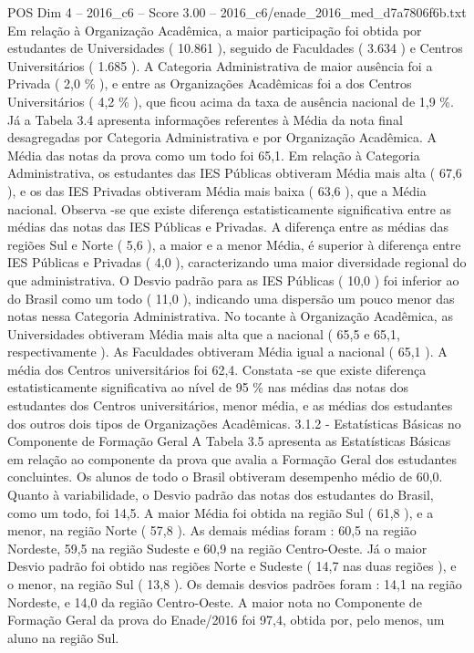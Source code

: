 \begin{textsample}{POS Dim 4 – 2016\_c6 – Score 3.00 – 2016\_c6/enade\_2016\_med\_d7a7806f6b.txt}
Em relação à Organização Acadêmica, a maior participação foi obtida por estudantes de Universidades ( 10.861 ), seguido de Faculdades ( 3.634 ) e Centros Universitários ( 1.685 ).
A Categoria Administrativa de maior ausência foi a Privada ( 2,0 \% ), e entre as Organizações Acadêmicas foi a dos Centros Universitários ( 4,2 \% ), que ficou acima da taxa de ausência nacional de 1,9 \%.
Já a Tabela 3.4 apresenta informações referentes à Média da nota final desagregadas por Categoria Administrativa e por Organização Acadêmica.
A Média das notas da prova como um todo foi 65,1.
Em relação à Categoria Administrativa, os estudantes das IES Públicas obtiveram Média mais alta ( 67,6 ), e os das IES Privadas obtiveram Média mais baixa ( 63,6 ), que a Média nacional.
Observa -se que existe diferença estatisticamente significativa entre as médias das notas das IES Públicas e Privadas.
A diferença entre as médias das regiões Sul e Norte ( 5,6 ), a maior e a menor Média, é superior à diferença entre IES Públicas e Privadas ( 4,0 ), caracterizando uma maior diversidade regional do que administrativa.
O Desvio padrão para as IES Públicas ( 10,0 ) foi inferior ao do Brasil como um todo ( 11,0 ), indicando uma dispersão um pouco menor das notas nessa Categoria Administrativa.
No tocante à Organização Acadêmica, as Universidades obtiveram Média mais alta que a nacional ( 65,5 e 65,1, respectivamente ).
As Faculdades obtiveram Média igual a nacional ( 65,1 ).
A média dos Centros universitários foi 62,4.
Constata -se que existe diferença estatisticamente significativa ao nível de 95 \% nas médias das notas dos estudantes dos Centros universitários, menor média, e as médias dos estudantes dos outros dois tipos de Organizações Acadêmicas. 3.1.2 - Estatísticas Básicas no Componente de Formação Geral A Tabela 3.5 apresenta as Estatísticas Básicas em relação ao componente da prova que avalia a Formação Geral dos estudantes concluintes.
Os alunos de todo o Brasil obtiveram desempenho médio de 60,0.
Quanto à variabilidade, o Desvio padrão das notas dos estudantes do Brasil, como um todo, foi 14,5.
A maior Média foi obtida na região Sul ( 61,8 ), e a menor, na região Norte ( 57,8 ).
As demais médias foram : 60,5 na região Nordeste, 59,5 na região Sudeste e 60,9 na região Centro-Oeste.
Já o maior Desvio padrão foi obtido nas regiões Norte e Sudeste ( 14,7 nas duas regiões ), e o menor, na região Sul ( 13,8 ).
Os demais desvios padrões foram : 14,1 na região Nordeste, e 14,0 da região Centro-Oeste.
A maior nota no Componente de Formação Geral da prova do Enade/2016 foi 97,4, obtida por, pelo menos, um aluno na região Sul.

\end{textsample}
